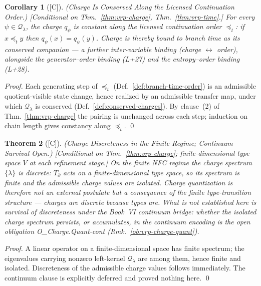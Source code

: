 \documentclass[12pt,oneside]{amsbook}
\theoremstyle{plain}
\newtheorem{theorem}{Theorem}[section]
\newtheorem{corollary}[theorem]{Corollary}
\theoremstyle{definition}
\theoremstyle{remark}
\newcommand{\status}[1]{\textup{[#1]}}
\begin{document}
\begin{corollary}[\status{C}]\label{cor:vrp-charge-conservation}
\textup{(Charge Is Conserved Along the Licensed Continuation Order.)}
\textup{[Conditional on Thm.~\ref{thm:vrp-charge},
Thm.~\ref{thm:vrp-time}.]}
For every $\psi\in\mathcal{Q}_\lambda$, the charge $q_\psi$ is constant
along the licensed continuation order $\preceq_t$: if $x \preceq_t y$
then $q_\psi(x) = q_\psi(y)$.  Charge is thereby bound to branch time
as its conserved companion --- a further inter-variable binding (charge
$\leftrightarrow$ order), alongside the generator--order binding (L+27)
and the entropy--order binding (L+28).
\end{corollary}

\begin{proof}
Each generating step of $\preceq_t$ (Def.~\ref{def:branch-time-order})
is an admissible quotient-visible state change, hence realized by an
admissible transfer map, under which $\mathcal{Q}_\lambda$ is conserved
(Def.~\ref{def:conserved-charges}).  By clause~(2) of
Thm.~\ref{thm:vrp-charge} the pairing is unchanged across each step;
induction on chain length gives constancy along $\preceq_t$. \qed
\end{proof}

\begin{theorem}[\status{C}]\label{thm:vrp-charge-quantization}
\textup{(Charge Discreteness in the Finite Regime; Continuum Survival
Open.)}
\textup{[Conditional on Thm.~\ref{thm:vrp-charge}; finite-dimensional
type space $V$ at each refinement stage.]}
On the finite NFC regime the charge spectrum $\{\lambda\}$ is
\emph{discrete}: $T_\partial$ acts on a finite-dimensional type space,
so its spectrum is finite and the admissible charge values are
isolated.  Charge quantization is therefore not an external postulate
but a consequence of the finite type-transition structure --- charges
are discrete because types are.  What is \emph{not} established here is
survival of discreteness under the Book~VI continuum bridge: whether
the isolated charge spectrum persists, or accumulates, in the continuum
encoding is the open obligation O\_Charge.Quant-cont
(Rmk.~\ref{ob:vrp-charge-quant}).
\end{theorem}

\begin{proof}
A linear operator on a finite-dimensional space has finite spectrum;
the eigenvalues carrying nonzero left-kernel $\mathcal{Q}_\lambda$ are
among them, hence finite and isolated.  Discreteness of the admissible
charge values follows immediately.  The continuum clause is explicitly
deferred and proved nothing here. \qed
\end{proof}
\end{document}
